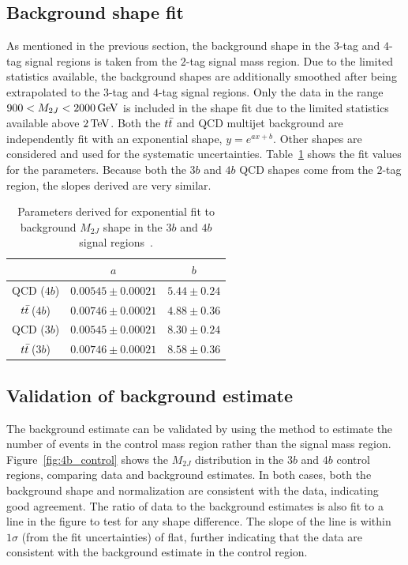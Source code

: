 \subsection{Background shape fit}

As mentioned in the previous section, the background shape in the $3$-tag and $4$-tag signal regions is taken from the $2$-tag signal mass region. Due to the limited statistics available, the background shapes are additionally smoothed after being extrapolated to the $3$-tag and $4$-tag signal regions. Only the data in the range $900 < M_{2J} < 2000 \GeV$ is included in the shape fit due to the limited statistics available above $2 \TeV$. Both the $t\bar{t}$ and QCD multijet background are independently fit with an exponential shape, $y = e^{ax+b}$. Other shapes are considered and used for the systematic uncertainties. Table~\ref{tab:shape_fit} shows the fit values for the parameters. Because both the $3b$ and $4b$ QCD shapes come from the $2$-tag region, the slopes derived are very similar. 

\begin{table}[h!]
\centering
\captionsetup{justification=centering}

\hspace{-10pt}
\begin{tabular}{|c|c|c|}
\hline
 & $a$ & $b$ \\ \hline
QCD ($4b$) & $0.00545 \pm 0.00021$ & $5.44 \pm 0.24$ \\ 
$t\bar{t}$\,($4b$) & $0.00746 \pm 0.00021$ & $4.88 \pm 0.36$ \\ \hline
QCD ($3b$) & $0.00545 \pm 0.00021$ & $8.30 \pm 0.24$ \\ 
$t\bar{t}$\,($3b$) & $0.00746 \pm 0.00021$ & $8.58 \pm 0.36$ \\ \hline
\end{tabular}
\caption{
Parameters derived for exponential fit to background $M_{2J}$ shape in the $3b$ and $4b$ signal regions~\cite{Qi}.
}
\label{tab:shape_fit}
\end{table}

\subsection{Validation of background estimate}

The background estimate can be validated by using the method to estimate the number of events in the control mass region rather than the signal mass region. Figure~\ref{fig:4b_control} shows the $M_{2J}$ distribution in the $3b$ and $4b$ control regions, comparing data and background estimates. In both cases, both the background shape and normalization are consistent with the data, indicating good agreement. The ratio of data to the background estimates is also fit to a line in the figure to test for any shape difference. The slope of the line is within $1\sigma$ (from the fit uncertainties) of flat, further indicating that the data are consistent with the background estimate in the control region. 

